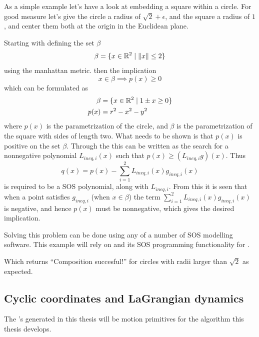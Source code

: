\begin{example}

As a simple example let's have a look at embedding a square within a circle. For
good measure let's give the circle a radius of \(\sqrt{2}+\epsilon\), and the
square a radius of \(1\), and center them both at the origin in the Euclidean
plane.

Starting with defining the set \(\beta\)
\[
  \beta = \lbrace x \in \mathbb{R}^2 \mid \lVert x\rVert \leq 2\rbrace
\]
using the manhattan metric. then the implication
\[
  x \in \beta \implies p(x) \geq 0
\]
which can be formulated as
\begin{align*}
  \beta &= \lbrace x \in \mathbb{R}^2 \mid 1 \pm x \geq 0 \rbrace \\
  p(x) &= r^2 - x^2 - y^2
\end{align*}
where \(p(x)\) is the parametrization of the circle, and \(\beta\) is the
parametrization of the square with sides of length two. What needs to be shown
is that \(p(x)\) is positive on the set \(\beta\). Through the
 this can be written as the search for a nonnegative
polynomial \(L_{ineq,i}(x)\) such that \(p(x) \geq \left( L_{ineq,i}g
\right)(x)\). Thus
\[
  q(x) = p(x) - \sum_{i=1}^{2}L_{ineq,i}(x)g_{ineq,i}(x)
\]
is required to be a \ac{SOS} polynomial, along with \(L_{ineq,i}\). From this it
is seen that when a point satisfies \(g_{ineq,i}\) (\ie when \(x \in \beta\))
the term \(\sum_{i=1}^{2}L_{ineq,i}(x)g_{ineq,i}(x)\) is negative, and hence
\(p(x)\) must be nonnegative, which gives the desired implication.

Solving this problem can be done using any of a number of \ac{SOS} modelling
software. This example will rely on \cite[Yalmip]{Lofberg2004} and its \ac{SOS}
programming functionality \cite{Lofberg2009} for \matlab.




Which returns ``Composition succesful!'' for circles with radii larger than
\(\sqrt{2}\) as expected.
\end{example}

\subsection{Cyclic coordinates and LaGrangian dynamics}
\label{subsec:cyclic-coordinates}

The \funnel{}'s generated in this thesis will be motion primitives for the
\rrtfunnel{} algorithm this thesis develops.


